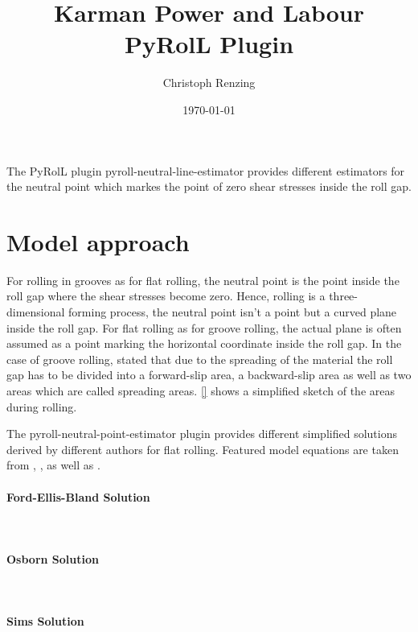 \documentclass[11pt]{PyRollDocs}
\begin{document}
    \title{Karman Power and Labour PyRolL Plugin}
    \author{Christoph Renzing}
    \date{\today}

    \maketitle

    The PyRolL plugin pyroll-neutral-line-estimator provides different estimators for the neutral point which markes the point of zero shear stresses inside the roll gap.


    \section{Model approach}\label{sec:model-approach}

    For rolling in grooves as for flat rolling, the neutral point is the point inside the roll gap where the shear stresses become zero.
    Hence, rolling is a three-dimensional forming process, the neutral point isn't a point but a curved plane inside the roll gap.
    For flat rolling as for groove rolling, the actual plane is often assumed as a point marking the horizontal coordinate inside the roll gap.
    In the case of groove rolling, \textcite{} stated that due to the spreading of the material the roll gap has to be divided into a forward-slip area, a backward-slip area
    as well as two areas which are called spreading areas.
    \autoref{} shows a simplified sketch of the areas during rolling.
    
    The pyroll-neutral-point-estimator plugin provides different simplified solutions derived by different authors for flat rolling.
    Featured model equations are taken from \textcite{}, \textcite{}, \textcite{} as well as \textcite{}.

    \paragraph{Ford-Ellis-Bland Solution}\\

    \paragraph{Osborn Solution}\\

    \paragraph{Sims Solution}\\
\end{document}
